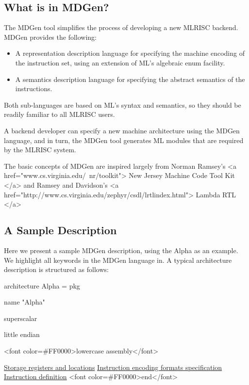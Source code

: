 \subsection{ What is in MDGen? }
The MDGen tool simplifies the process of developing a new MLRISC backend.  
MDGen provides the following:
\begin{itemize}
   \item A representation description language for specifying the
     machine encoding of the instruction set,
     using an extension of ML's algebraic enum facility.
   \item A semantics description language for specifying the abstract semantics
      of the instructions.
\end{itemize}

Both sub-languages are based on ML's syntax and semantics, so
they should be readily familiar to all MLRISC users.

A backend developer can specify a new machine architecture using the MDGen 
language, and in turn, the MDGen tool generates ML modules that are
required by the MLRISC system.

The basic concepts of MDGen are inspired largely from 
Norman Ramsey's <a href="www.cs.virginia.edu/~nr/toolkit">
New Jersey Machine Code Tool Kit </a> and 
Ramsey and Davidson's
<a href="http://www.cs.virginia.edu/zephyr/csdl/lrtlindex.html">
Lambda RTL </a>

\subsection{A Sample Description}

Here we present a sample MDGen description, using the Alpha as an example.
We highlight all keywords in the MDGen language 
in.  A typical architecture description
is structured as follows:

\begin{SML}
architecture Alpha =
   pkg

   name "Alpha"

   superscalar

   little endian

   <font color=#FF0000>lowercase assembly</font>

   \href{#registers}{Storage registers and locations}
   \href{#encoding}{Instruction encoding formats specification}
   \href{#instruction}{Instruction definition}
<font color=#FF0000>end</font>
\end{SML}

